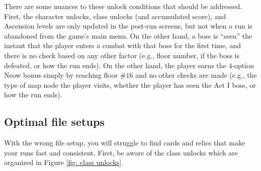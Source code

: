 \documentclass[12pt]{amsart}
\begin{document}
There are some nuances to these unlock conditions that should be addressed.  
First, the character unlocks, class unlocks (and accumulated score), and Ascension levels are only updated in the post-run screens, but not when a run is abandoned from the game's main menu.  
On the other hand, a boss is ``seen'' the instant that the player enters a combat with that boss for the first time, and there is no check based on any other factor (e.g., floor number, if the boss is defeated, or how the run ends).  
On the other hand, the player earns the $4$-option Neow bonus simply by reaching floor $\#16$ and no other checks are made (e.g., the type of map node the player visits, whether the player has seen the Act I boss, or how the run ends).  

\subsection{Optimal file setups}
With the wrong file setup, you will struggle to find cards and relics that make your runs fast and consistent.  
First, be aware of the class unlocks which are organized in Figure \ref{fig: class unlocks}.  
\end{document}
